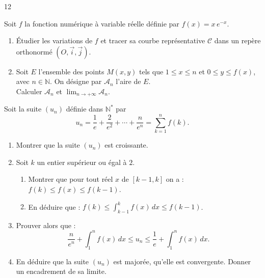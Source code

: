 \documentclass{axiobac}
\begin{document}
\begin{probleme}{12}


Soit $f$ la fonction numérique à variable réelle définie par $f(x) = x\,e^{-x}$.

\begin{enumerate}
    \item Étudier les variations de $f$ et tracer sa courbe représentative $\mathcal{C}$ dans un repère orthonormé $(O, \vec{i}, \vec{j})$.
    \item Soit $E$ l'ensemble des points $M(x, y)$ tels que $1 \leqslant x \leqslant n$ et $0 \leqslant y \leqslant f(x)$, avec $n \in \mathbb{N}$. On désigne par $\mathcal{A}_n$ l'aire de $E$. \\
    Calculer $\mathcal{A}_n$ et $\displaystyle\lim_{n \to +\infty} \mathcal{A}_n$.
\end{enumerate}


Soit la suite $(u_n)$ définie dans $\mathbb{N}^*$ par
\[
u_n = \frac{1}{e} + \frac{2}{e^2} + \cdots + \frac{n}{e^n} = \sum_{k=1}^{n} f(k) .
\]

\begin{enumerate}
    \item Montrer que la suite $(u_n)$ est croissante.
    \item Soit $k$ un entier supérieur ou égal à $2$.
    \begin{enumerate}
        \item Montrer que pour tout réel $x$ de $[k-1, k]$ on a : $f(k) \leqslant f(x) \leqslant f(k-1)$.
        \item En déduire que : $f(k) \leqslant \displaystyle\int_{k-1}^{k} f(x)\,dx \leqslant f(k-1)$.
    \end{enumerate}
    \item Prouver alors que :
    \[
    \frac{n}{e^n} + \int_1^n f(x)\,dx \leqslant u_n \leqslant \frac{1}{e} + \int_1^n f(x)\,dx .
    \]
    \item En déduire que la suite $(u_n)$ est majorée, qu'elle est convergente. Donner un encadrement de sa limite.
\end{enumerate}


\end{probleme}
\end{document}
